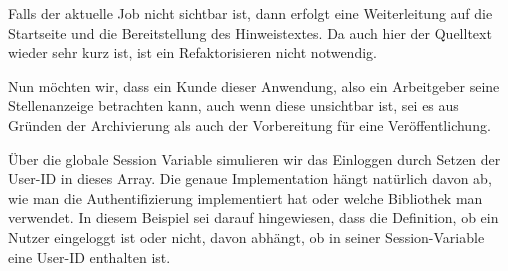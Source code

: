 \tddgreen
Falls der aktuelle Job nicht sichtbar ist, dann erfolgt eine Weiterleitung auf die Startseite und die Bereitstellung des Hinweistextes.
\tddrefactor
Da auch hier der Quelltext wieder sehr kurz ist, ist ein Refaktorisieren nicht notwendig.

Nun möchten wir, dass ein Kunde dieser Anwendung, also ein Arbeitgeber seine Stellenanzeige betrachten kann, auch wenn diese unsichtbar ist, sei es aus Gründen der Archivierung als auch der Vorbereitung für eine Veröffentlichung.

%
%
%
\begin{ruby}[label=test/functional/job\_controller\_test.rb]
  
    
  \PY{o}{[}\PY{o}{]}  

      

   
\end{ruby}

\tddred
Über die globale Session Variable simulieren wir das Einloggen durch Setzen der User-ID in dieses Array. Die genaue Implementation hängt natürlich davon ab, wie man die Authentifizierung implementiert hat oder welche Bibliothek man verwendet. In diesem Beispiel sei darauf hingewiesen, dass die Definition, ob ein Nutzer eingeloggt ist oder nicht, davon abhängt, ob in seiner Session-Variable eine User-ID enthalten ist.

%
\begin{ruby}[label=app/controllers/job\_controller.rb]
 
    \PY{o}{[}\PY{o}{]}
       \PY{o}{[}\PY{o}{]}
        
\end{ruby}

